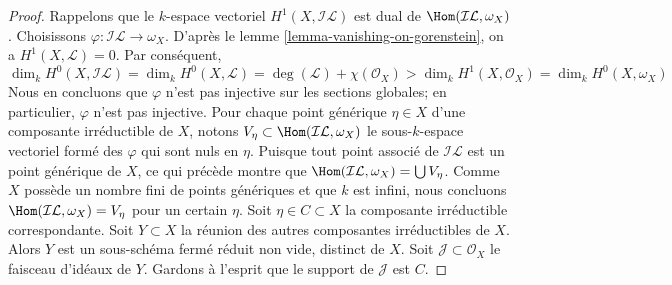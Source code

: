 \begin{proof}
\medskip\noindent
Rappelons que le $k$-espace vectoriel $H^1(X, \mathcal{I}\mathcal{L})$ est dual de $\Hom(\mathcal{I}\mathcal{L}, \omega_X)$. Choisissons $\varphi : \mathcal{I}\mathcal{L} \to \omega_X$. D'après le lemme \ref{lemma-vanishing-on-gorenstein}, on a $H^1(X, \mathcal{L}) = 0$. Par conséquent, \begingroup\footnotesize $$
\dim_k H^0(X, \mathcal{I}\mathcal{L}) = \dim_k H^0(X, \mathcal{L}) =
\deg(\mathcal{L}) + \chi(\mathcal{O}_X) > \dim_k H^1(X, \mathcal{O}_X) =
\dim_k H^0(X, \omega_X)
$$\endgroup Nous en concluons que $\varphi$ n'est pas injective sur les sections globales; en particulier, $\varphi$ n'est pas injective. Pour chaque point générique $\eta \in X$ d'une composante irréductible de $X$, notons $V_\eta \subset \Hom(\mathcal{I}\mathcal{L}, \omega_X)$ le sous-$k$-espace vectoriel formé des $\varphi$ qui sont nuls en $\eta$. Puisque tout point associé de $\mathcal{I}\mathcal{L}$ est un point générique de $X$, ce qui précède montre que $\Hom(\mathcal{I}\mathcal{L}, \omega_X) = \bigcup V_\eta$. Comme $X$ possède un nombre fini de points génériques et que $k$ est infini, nous concluons $\Hom(\mathcal{I}\mathcal{L}, \omega_X) = V_\eta$ pour un certain $\eta$. Soit $\eta \in C \subset X$ la composante irréductible correspondante. Soit $Y \subset X$ la réunion des autres composantes irréductibles de $X$. Alors $Y$ est un sous-schéma fermé réduit non vide, distinct de $X$. Soit $\mathcal{J} \subset \mathcal{O}_X$ le faisceau d'idéaux de $Y$. Gardons à l'esprit que le support de $\mathcal{J}$ est $C$.


\end{proof}
